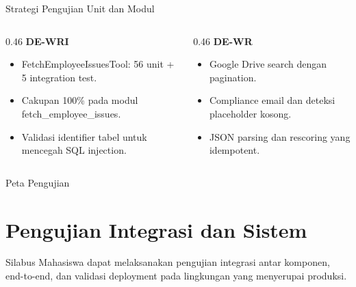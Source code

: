 \begin{comparisonframe}{Strategi Pengujian Unit dan Modul}
    \begin{columns}[T,onlytextwidth]
        \begin{column}{0.46\textwidth}
            \textbf{DE-WRI}\par
            \begin{itemize}\setlength{\itemsep}{3pt}
                \item FetchEmployeeIssuesTool: 56 unit + 5 integration test.
                \item Cakupan 100\% pada modul fetch\_employee\_issues.
                \item Validasi identifier tabel untuk mencegah SQL injection.
            \end{itemize}
        \end{column}
        \begin{column}{0.46\textwidth}
            \textbf{DE-WR}\par
            \begin{itemize}\setlength{\itemsep}{3pt}
                \item Google Drive search dengan pagination.
                \item Compliance email dan deteksi placeholder kosong.
                \item JSON parsing dan rescoring yang idempotent.
            \end{itemize}
        \end{column}
    \end{columns}
    \vspace{0.1cm}
\end{comparisonframe}

\begin{contentframe}{Peta Pengujian}
\end{contentframe}

\section{Pengujian Integrasi dan Sistem}

\begin{contentframe}{Silabus}
    \small
    Mahasiswa dapat melaksanakan pengujian integrasi antar komponen, end-to-end, dan validasi deployment pada lingkungan yang menyerupai produksi.
\end{contentframe}

